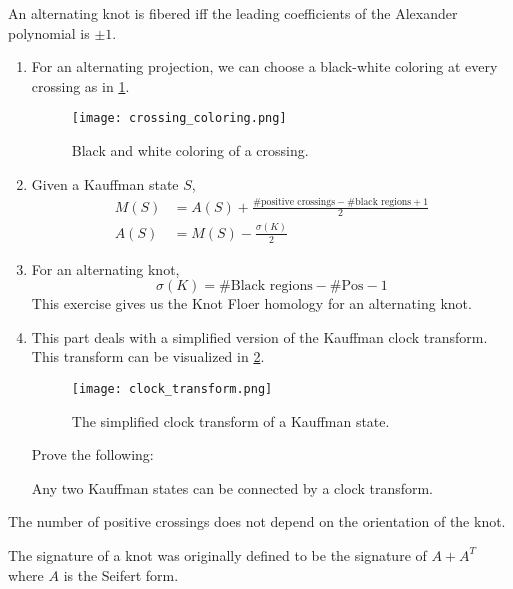 \documentclass{amsproc}
\begin{document}
\begin{thm}
An alternating knot is fibered iff the leading coefficients of the Alexander polynomial
is $\pm 1$.
\end{thm}

\begin{exr}
\begin{enumerate}
\item For an alternating projection, we can choose a black-white coloring at every crossing as in 
\cref{fig:bw_coloring}.
\begin{figure}
\texttt{[image: crossing\_coloring.png]}
\caption{Black and white coloring of a crossing.}
\label{fig:bw_coloring}
\end{figure}
\item Given a Kauffman state $S$, 
\begin{align}
M\left( S \right) &= A\left( S \right) + \frac{\# \text{positive crossings} - 
\# \text{black regions}+1}{2}\\
A\left( S \right) &= M\left( S \right) - \frac{\sigma\left( K \right)}{2}
\end{align}
\item For an alternating knot, 
\begin{equation}
\sigma\left( K \right) = \# \text{Black regions} -  \# \text{Pos} - 1
\end{equation}
This exercise gives us the Knot Floer homology for an alternating knot.
\item This part deals with a simplified version of the Kauffman clock transform.
This transform can be visualized in \cref{fig:clock_transform_simple}.
\begin{figure}
\texttt{[image: clock\_transform.png]}
\caption{The simplified clock transform of a Kauffman state.}
\label{fig:clock_transform_simple}
\end{figure}
Prove the following:
\begin{thm}
Any two Kauffman states can be connected by a clock transform.
\end{thm}
\end{enumerate}
\end{exr}

\begin{prop}
The number of positive crossings does not depend on the orientation of the knot.
\end{prop}

\begin{rmk}
The signature of a knot was originally defined to be the signature of $A + A^T$ where
$A$ is the Seifert form.
\end{rmk}
\end{document}
